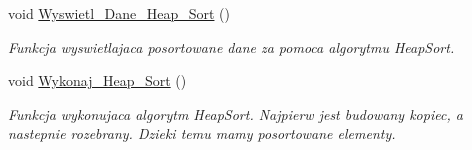 \begin{DoxyCompactItemize}
void \hyperlink{class_kolejka_aba08defbed8f23d0f7d17513dc296f57}{\-Wyswietl\-\_\-\-Dane\-\_\-\-Heap\-\_\-\-Sort} ()
\begin{DoxyCompactList}\small\item\em \-Funkcja wyswietlajaca posortowane dane za pomoca algorytmu \-Heap\-Sort. \end{DoxyCompactList}\item 
void \hyperlink{class_kolejka_ad9a907fcc67803e1ff8a348ecde1aa5b}{\-Wykonaj\-\_\-\-Heap\-\_\-\-Sort} ()
\begin{DoxyCompactList}\small\item\em \-Funkcja wykonujaca algorytm \-Heap\-Sort. \-Najpierw jest budowany kopiec, a nastepnie rozebrany. \-Dzieki temu mamy posortowane elementy. \end{DoxyCompactList}\end{DoxyCompactItemize}
